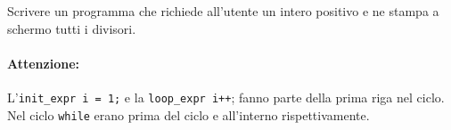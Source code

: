 \begin{Exercise}[label={ex:divisori}]
  Scrivere un programma che richiede all'utente un intero positivo e ne stampa a schermo tutti i divisori.
\end{Exercise}

\begin{Answer}[ref={ex:divisori}]
  

  
  \paragraph{Attenzione: }
  		L'\verb+init_expr i = 1;+ e la \verb-loop_expr i++-; fanno parte della prima riga nel ciclo. Nel ciclo \verb+while+ erano prima del ciclo e all'interno rispettivamente.
\end{Answer}
